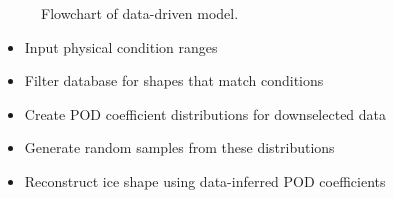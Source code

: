\documentclass[9pt]{beamer}
\begin{document}
\begin{frame}
\begin{figure}[!ht]
  \caption{Flowchart of data-driven model.}
\end{figure}
\fontsize{9}\selectfont
\begin{itemize}
\item Input physical condition ranges
\item Filter database for shapes that match conditions
\item Create POD coefficient distributions for downselected data
\item Generate random samples from these distributions
\item Reconstruct ice shape using data-inferred POD coefficients
\end{itemize}
\end{frame}
\end{document}
